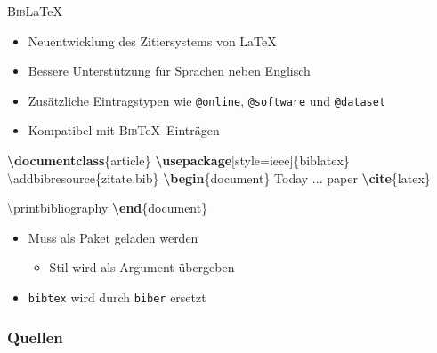 \documentclass[aspectratio=169]{beamer}
\providecommand{\tightlist}{\setlength{\itemsep}{0pt}\setlength{\parskip}{0pt}}
\newenvironment{Shaded}{\begin{snugshade}}{\end{snugshade}}
\newcommand{\BuiltInTok}[1]{\textcolor[rgb]{0.25,0.67,0.19}{\textbf{#1}}}
\newcommand{\ExtensionTok}[1]{\textcolor[rgb]{0.25,0.67,0.19}{#1}}
\newcommand{\FunctionTok}[1]{\textcolor[rgb]{0.34,0.51,0.35}{#1}}
\newcommand{\KeywordTok}[1]{\textcolor[rgb]{0.25,0.67,0.19}{\textbf{#1}}}
\newcommand{\NormalTok}[1]{\textcolor[rgb]{0.19,0.19,0.19}{#1}}
\newenvironment{Shaded}{}{}
\newcommand\citestyle[1]{\textcolor{foreground-secondary}{\textsuperscript{#1}}}
\let\oldautocite\autocite
\renewcommand{\autocite}[1]{\citestyle{\oldautocite{#1}}}
\begin{document}
    \begin{frame}[fragile]{\textsc{Bib}\LaTeX}
    \protect\hypertarget{section-2}{}
    \begin{itemize}
    \tightlist
    \item
      Neuentwicklung des Zitiersystems von
      \LaTeX \autocite{ctan-biblatex}
    \item
      Bessere Unterstützung für Sprachen neben Englisch
      \autocite{ctan-biblatex}
    \item
      Zusätzliche Eintragstypen wie \texttt{@online}, \texttt{@software}
      und \texttt{@dataset} \autocite{biblatex}
    \item
      Kompatibel mit \textsc{Bib}\TeX~Einträgen \autocite{biblatex}
    \end{itemize}

    \begin{minipage}{0.66\textwidth}

\begin{Shaded}
\begin{Highlighting}[]
\BuiltInTok{\textbackslash{}documentclass}\NormalTok{\{}\ExtensionTok{article}\NormalTok{\}}
\BuiltInTok{\textbackslash{}usepackage}\NormalTok{[style=ieee]\{}\ExtensionTok{biblatex}\NormalTok{\}}
\FunctionTok{\textbackslash{}addbibresource}\NormalTok{\{zitate.bib\}}
\KeywordTok{\textbackslash{}begin}\NormalTok{\{}\ExtensionTok{document}\NormalTok{\}}
\NormalTok{\textasciigrave{}\textasciigrave{}Today ... paper\textquotesingle{}\textquotesingle{} }
\KeywordTok{\textbackslash{}cite}\NormalTok{\{}\ExtensionTok{latex}\NormalTok{\}}

\FunctionTok{\textbackslash{}printbibliography}
\KeywordTok{\textbackslash{}end}\NormalTok{\{}\ExtensionTok{document}\NormalTok{\}}
\end{Highlighting}
\end{Shaded}

    \end{minipage}\begin{minipage}{0.33\textwidth}

    \begin{itemize}
    \tightlist
    \item
      Muss als Paket geladen werden \autocite{biblatex}

      \begin{itemize}
      \tightlist
      \item
        Stil wird als Argument übergeben
      \end{itemize}
    \item
      \texttt{bibtex} wird durch \texttt{biber} ersetzt
      \autocite{biblatex}
    \end{itemize}

    \end{minipage}
    \end{frame}

        \begin{frame}[allowframebreaks]
            \frametitle{Quellen}
            \printbibliography[heading=none]
    \end{frame}
    
    
\end{document}
